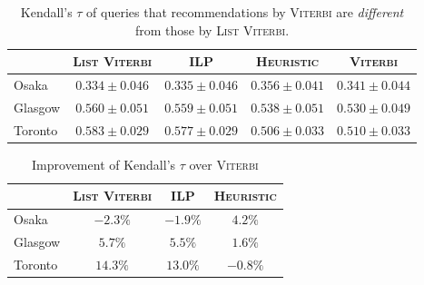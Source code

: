 \begin{table*}[!t]
\label{tab:tau-diff}
\caption{Kendall's $\tau$ of queries that recommendations by \textsc{Viterbi} are \emph{different} from those by \textsc{List Viterbi}.}
\centering
\begin{tabular}{l|ccc|c} \hline
 & \textsc{List Viterbi} & \textsc{ILP} & \textsc{Heuristic} & \textsc{Viterbi} \\ \hline
Osaka & $0.334\pm0.046$ & $0.335\pm0.046$ & $0.356\pm0.041$ & $0.341\pm0.044$ \\
Glasgow & $0.560\pm0.051$ & $0.559\pm0.051$ & $0.538\pm0.051$ & $0.530\pm0.049$ \\
Toronto & $0.583\pm0.029$ & $0.577\pm0.029$ & $0.506\pm0.033$ & $0.510\pm0.033$ \\
\hline
\end{tabular}
\end{table*}

\begin{table*}[!t]
\caption{Improvement of Kendall's $\tau$ over \textsc{Viterbi}}
\label{tab:tau-up}
\centering
\begin{tabular}{l|ccc} \hline
 & \textsc{List Viterbi} & \textsc{ILP} & \textsc{Heuristic} \\ \hline
Osaka & $-2.3\%$ & $-1.9\%$ & $4.2\%$ \\
Glasgow & $5.7\%$ & $5.5\%$ & $1.6\%$ \\
Toronto & $14.3\%$ & $13.0\%$ & $-0.8\%$ \\
\hline
\end{tabular}
\end{table*}

